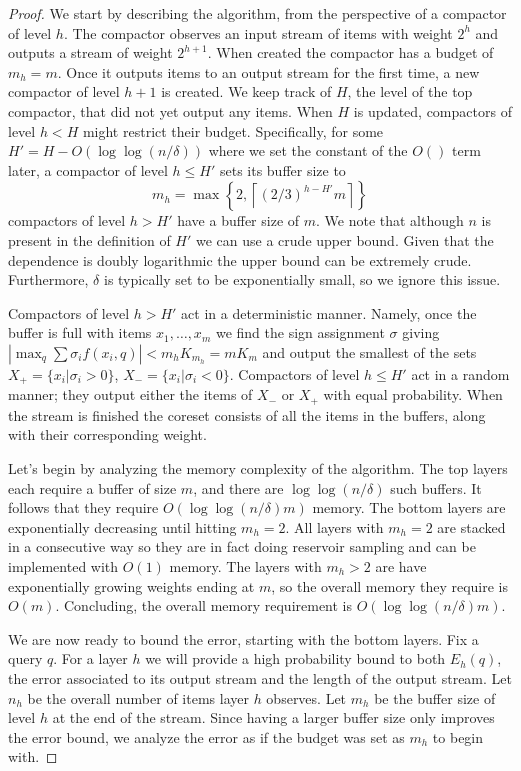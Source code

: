 \documentclass[anon,12pt]{colt2019} %
\newcommand{\ceil}[1]{\left \lceil #1 \right \rceil}
\begin{document}
\begin{proof}
We start by describing the algorithm, from the perspective of a compactor of level $h$. The compactor observes an input stream of items with weight $2^h$ and outputs a stream of weight $2^{h+1}$. When created the compactor has a budget of $m_h=m$. Once it outputs items to an output stream for the first time, a new compactor of level $h+1$ is created. We keep track of $H$, the level of the top compactor, that did not yet output any items. When $H$ is updated, compactors of level $h<H$ might restrict their budget. Specifically, for some $H'=H-O(\log\log(n/\delta))$ where we set the constant of the $O()$ term later, a compactor of level $h \leq H'$ sets its buffer size to
$$ m_h = \max\left\{2, \ceil{(2/3)^{h-H'}m} \right\} $$
compactors of level $h >H'$ have a buffer size of $m$. We note that although $n$ is present in the definition of $H'$ we can use a crude upper bound. Given that the dependence is doubly logarithmic the upper bound can be extremely crude. Furthermore, $\delta$ is typically set to be exponentially small, so we ignore this issue.

Compactors of level $h >H'$ act in a deterministic manner. Namely, once the buffer is full with items $x_1,\ldots,x_m$ we find the sign assignment $\sigma$ giving $\left|\max_q \sum \sigma_i f(x_i, q)\right| < m_hK_{m_h}=mK_m$ and output the smallest of the sets $X_+=\{x_i | \sigma_i > 0 \}$, $X_- = \{x_i | \sigma_i < 0 \}$. Compactors of level $h \leq H'$ act in a random manner; they output either the items of $X_-$ or $X_+$ with equal probability. When the stream is finished the coreset consists of all the items in the buffers, along with their corresponding weight.

Let's begin by analyzing the memory complexity of the algorithm. The top layers each require a buffer of size $m$, and there are $\log\log(n/\delta)$ such buffers. It follows that they require $O(\log\log(n/\delta)m)$ memory. The bottom layers are exponentially decreasing until hitting $m_h=2$. All layers with $m_h=2$ are stacked in a consecutive way so they are in fact doing reservoir sampling and can be implemented with $O(1)$ memory. The layers with $m_h>2$ are have exponentially growing weights ending at $m$, so the overall memory they require is $O(m)$. Concluding, the overall memory requirement is $O(\log\log(n/\delta)m)$.

We are now ready to bound the error, starting with the bottom layers. Fix a query $q$. For a layer $h$ we will provide a high probability bound to both $E_h(q)$, the error associated to its output stream and the length of the output stream. Let $n_h$ be the overall number of items layer $h$ observes. Let $m_h$ be the buffer size of level $h$ at the end of the stream. Since having a larger buffer size only improves the error bound, we analyze the error as if the budget was set as $m_h$ to begin with.


\end{proof}
\end{document}
